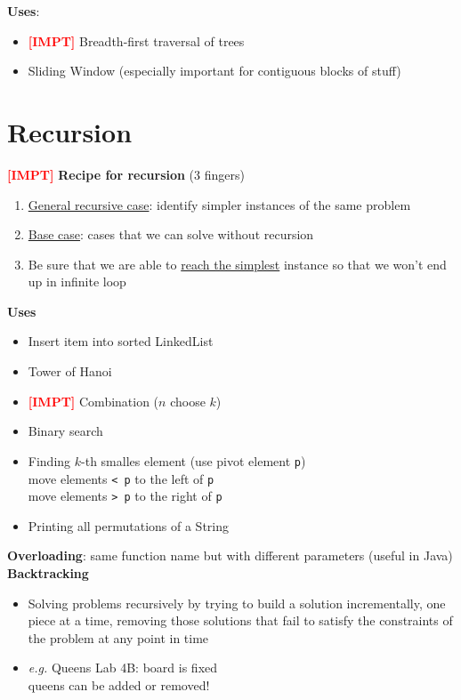 \documentclass{article}
\newcommand{\eg}[0]{\textit{e.g. }}
\newcommand{\impt}[0]{\textcolor{red}{\textbf{[IMPT] }}}
\begin{document}
\begin{multicols}{2}
\textbf{Uses}:
\begin{itemize}
	\item \impt Breadth-first traversal of trees
	\item Sliding Window (especially important for contiguous blocks of stuff)
\end{itemize}
\section{Recursion}
\impt \textbf{Recipe for recursion} (3 fingers)
\begin{enumerate}
	\item \underline{General recursive case}: identify simpler instances of the same problem
	\item \underline{Base case}: cases that we can solve without recursion
	\item Be sure that we are able to \underline{reach the simplest} instance so that we won't end up in infinite loop
\end{enumerate}
\textbf{Uses}
\begin{itemize}
	\item Insert item into sorted LinkedList
	\item Tower of Hanoi
	\item \impt Combination ($n$ choose $k$)
	\item Binary search
	\item Finding $k$-th smalles element (use pivot element \texttt{p})\\
	move elements \texttt{< p} to the left of \texttt{p}\\
	move elements \texttt{> p} to the right of \texttt{p}
	\item Printing all permutations of a String
\end{itemize}
\textbf{Overloading}: same function name but with different parameters (useful in Java)\\
\textbf{Backtracking}
\begin{itemize}
	\item Solving problems recursively by trying to build a solution incrementally, one piece at a time, removing those solutions that fail to satisfy the constraints of the problem at any point in time
	\item \eg Queens Lab 4B: board is fixed\\
	queens can be added or removed!
\end{itemize}

\end{multicols}
\end{document}
